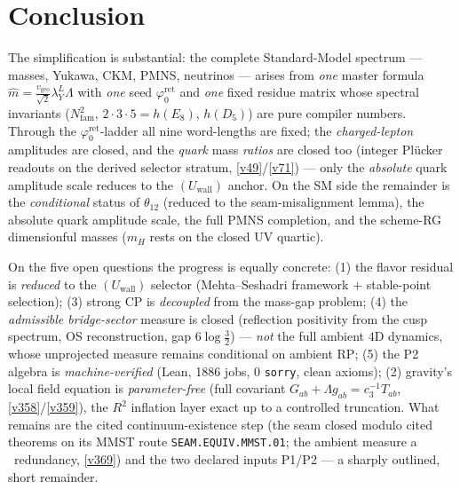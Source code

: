 \documentclass[11pt,a4paper]{article}
\newcommand{\Nfam}{N_{\mathrm{fam}}}
\newcommand{\cthree}{c_3}
\newcommand{\phiz}{\varphi_0^{\mathrm{ret}}}
\newcommand{\lamY}{\lambda_Y}
\newcommand{\vgeo}{v_{\mathrm{geo}}}
\theoremstyle{definition}
\begin{document}
\section*{Conclusion}
The simplification is substantial: the complete Standard-Model spectrum --- masses, Yukawa, CKM, PMNS,
neutrinos --- arises from \emph{one} master formula $\hat m=\tfrac{\vgeo}{\sqrt2}\lamY^{L}\Lambda$ with
\emph{one} seed $\phiz$ and \emph{one} fixed residue matrix whose spectral invariants
($\Nfam^2$, $2{\cdot}3{\cdot}5{=}h(E_8)$, $h(D_5)$) are pure compiler numbers. Through the $\phiz$-ladder all
nine word-lengths are fixed; the \emph{charged-lepton} amplitudes are closed, and the \emph{quark} mass
\emph{ratios} are closed too (integer Plücker readouts on the derived selector stratum, \vref{v49}/\vref{v71}) --- only the
\emph{absolute} quark amplitude scale reduces to the $(U_{\mathrm{wall}})$ anchor. On
the SM side the remainder is the \emph{conditional} status of $\theta_{12}$ (reduced to the
seam-misalignment lemma), the absolute quark amplitude scale, the full PMNS completion, and the scheme-RG
dimensionful masses ($m_H$ rests on the closed UV quartic).

On the five open questions the progress is equally concrete: (1) the flavor residual is \emph{reduced} to
the $(U_{\mathrm{wall}})$ selector (Mehta--Seshadri framework $+$ stable-point selection); (3) strong CP is
\emph{decoupled} from the mass-gap problem; (4) the \emph{admissible
bridge-sector} measure is closed (reflection positivity from the cusp spectrum, OS reconstruction, gap
$6\log\tfrac32$) --- \emph{not} the full ambient $4$D dynamics, whose unprojected measure remains
conditional on ambient RP; (5) the P2 algebra is \emph{machine-verified} (Lean, 1886 jobs, 0
\texttt{sorry}, clean axioms); (2) gravity's local field equation is \emph{parameter-free} (full covariant
$G_{ab}{+}\Lambda g_{ab}{=}\cthree^{-1}T_{ab}$, \vref{v358}/\vref{v359}), the $R^2$ inflation layer exact up to
a controlled truncation. What remains are the cited continuum-existence step (the seam closed modulo cited
theorems on its MMST route \texttt{SEAM.EQUIV.MMST.01}; the ambient measure a \mC\ redundancy, \vref{v369}) and the two declared inputs P1/P2 --- a
sharply outlined, short remainder.

\clearpage
\end{document}
